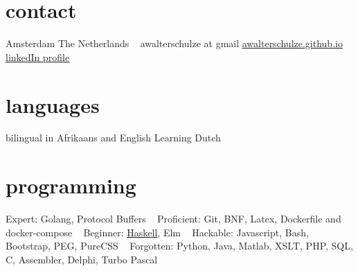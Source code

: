 \documentclass[]{friggeri-cv} %
\begin{document}

\begin{aside} %
\section{contact}
Amsterdam
The Netherlands
~
awalterschulze at gmail
\href{http://awalterschulze.github.io}{awalterschulze.github.io}
\href{https://za.linkedin.com/in/schulzewalter}{linkedIn profile}
\section{languages}
bilingual in Afrikaans and English
Learning Dutch
\section{programming}
%
Expert: 
Golang, Protocol Buffers
~
Proficient: 
Git, BNF, Latex, Dockerfile and docker-compose
~
Beginner:
\href{https://trello.com/b/ij35amXZ/mylearninghaskell}{Haskell}, Elm
~
Hackable:
Javascript, Bash, Bootstrap, PEG, PureCSS
~
Forgotten:
Python, Java, Matlab, XSLT, PHP, SQL, C, Assembler, Delphi, Turbo Pascal
\end{aside}
\end{document}
